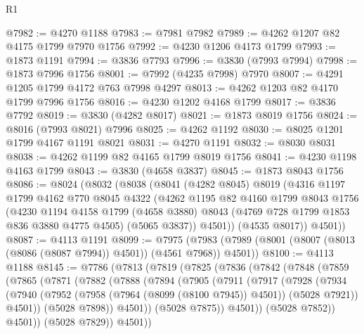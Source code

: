 \begin{lexlean}{R1}
\begin{coremodule}
@7982 := @4270 @1188
@7983 := @7981 @7982
@7989 := @4262 @1207 @82 @4175 @1799 @7970 @1756
@7992 := @4230 @1206 @4173 @1799
@7993 := @1873 @1191
@7994 := @3836 @7793
@7996 := @3830 (@7993 @7994)
@7998 := @1873 @7996 @1756
@8001 := @7992 (@4235 @7998) @7970
@8007 := @4291 @1205 @1799 @4172 @763 @7998 @4297
@8013 := @4262 @1203 @82 @4170 @1799 @7996 @1756
@8016 := @4230 @1202 @4168 @1799
@8017 := @3836 @7792
@8019 := @3830 (@4282 @8017)
@8021 := @1873 @8019 @1756
@8024 := @8016 (@7993 @8021) @7996
@8025 := @4262 @1192
@8030 := @8025 @1201 @1799 @4167 @1191 @8021
@8031 := @4270 @1191
@8032 := @8030 @8031
@8038 := @4262 @1199 @82 @4165 @1799 @8019 @1756
@8041 := @4230 @1198 @4163 @1799
@8043 := @3830 (@4658 @3837)
@8045 := @1873 @8043 @1756
@8086 := @8024
    (@8032
      (@8038
        (@8041
          (@4282 @8045)
          @8019
          (@4316
            @1197
            @1799
            @4162
            @770
            @8045
            @4322
            (@4262
              @1195
              @82
              @4160
              @1799
              @8043
              @1756
              (@4230
                @1194
                @4158
                @1799
                (@4658 @3880)
                @8043
                (@4769 @728 @1799 @1853 @836 @3880 @4775 @4505)
                (@5065 @3837))
              @4501))
          (@4535 @8017))
        @4501))
@8087 := @4113 @1191
@8099 := @7975
    (@7983 (@7989 (@8001 (@8007 (@8013 (@8086 (@8087 @7994)) @4501)) (@4561 @7968)) @4501))
@8100 := @4113 @1188
@8145 := @7786
    (@7813
      (@7819
        (@7825
          (@7836
            (@7842
              (@7848
                (@7859
                  (@7865
                    (@7871
                      (@7882
                        (@7888
                          (@7894
                            (@7905
                              (@7911
                                (@7917
                                  (@7928
                                    (@7934
                                      (@7940
                                        (@7952
                                          (@7958 (@7964 (@8099 (@8100 @7945)) @4501))
                                          (@5028 @7921))
                                        @4501))
                                    (@5028 @7898))
                                  @4501))
                              (@5028 @7875))
                            @4501))
                        (@5028 @7852))
                      @4501))
                  (@5028 @7829))
                @4501))

\end{coremodule}
\end{lexlean}
